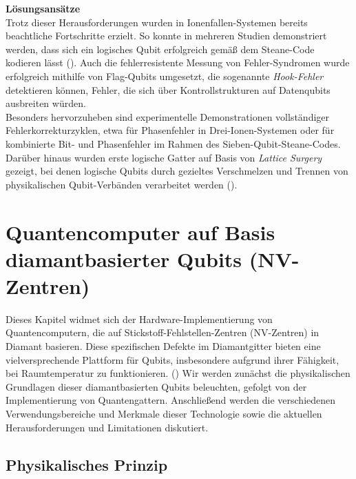 \textbf{Lösungsansätze} \\
Trotz dieser Herausforderungen wurden in Ionenfallen-Systemen bereits beachtliche Fortschritte erzielt. So konnte in mehreren Studien demonstriert werden, dass sich ein logisches Qubit erfolgreich gemäß dem Steane-Code kodieren lässt (\cite{strohmIonBasedQuantumComputing2024}). Auch die fehlerresistente Messung von Fehler-Syndromen wurde erfolgreich mithilfe von Flag-Qubits umgesetzt, die sogenannte \textit{Hook-Fehler} detektieren können, Fehler, die sich über Kontrollstrukturen auf Datenqubits ausbreiten würden. \\

Besonders hervorzuheben sind experimentelle Demonstrationen vollständiger Fehlerkorrekturzyklen, etwa für Phasenfehler in Drei-Ionen-Systemen oder für kombinierte Bit- und Phasenfehler im Rahmen des Sieben-Qubit-Steane-Codes. Darüber hinaus wurden erste logische Gatter auf Basis von \textit{Lattice Surgery} gezeigt, bei denen logische Qubits durch gezieltes Verschmelzen und Trennen von physikalischen Qubit-Verbänden verarbeitet werden (\cite{strohmIonBasedQuantumComputing2024}).

\section{Quantencomputer auf Basis diamantbasierter Qubits (NV-Zentren)}
Dieses Kapitel widmet sich der Hardware-Implementierung von Quantencomputern, die auf Stickstoff-Fehlstellen-Zentren (NV-Zentren) in Diamant basieren. Diese spezifischen Defekte im Diamantgitter bieten eine vielversprechende Plattform für Qubits, insbesondere aufgrund ihrer Fähigkeit, bei Raumtemperatur zu funktionieren. (\cite{StickstoffFehlstellenZentrum2025}) Wir werden zunächst die physikalischen Grundlagen dieser diamantbasierten Qubits beleuchten, gefolgt von der Implementierung von Quantengattern. Anschließend werden die verschiedenen Verwendungsbereiche und Merkmale dieser Technologie sowie die aktuellen Herausforderungen und Limitationen diskutiert.
\subsection{Physikalisches Prinzip}
